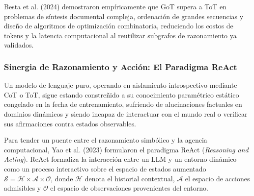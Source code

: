 Besta et al. (2024) demostraron empíricamente que GoT supera a ToT en problemas de síntesis documental compleja, ordenación de grandes secuencias y diseño de algoritmos de optimización combinatoria, reduciendo los costos de tokens y la latencia computacional al reutilizar subgrafos de razonamiento ya validados.

\subsubsection{Sinergia de Razonamiento y Acción: El Paradigma ReAct}

Un modelo de lenguaje puro, operando en aislamiento introspectivo mediante CoT o ToT, sigue estando constreñido a su conocimiento paramétrico estático congelado en la fecha de entrenamiento, sufriendo de alucinaciones factuales en dominios dinámicos y siendo incapaz de interactuar con el mundo real o verificar sus afirmaciones contra estados observables.

Para tender un puente entre el razonamiento simbólico y la agencia computacional, Yao et al. (2023) formularon el paradigma ReAct (\textit{Reasoning and Acting}). ReAct formaliza la interacción entre un LLM y un entorno dinámico como un proceso interactivo sobre el espacio de estados aumentado $\mathcal{S} = \mathcal{H} \times \mathcal{A} \times \mathcal{O}$, donde $\mathcal{H}$ denota el historial contextual, $\mathcal{A}$ el espacio de acciones admisibles y $\mathcal{O}$ el espacio de observaciones provenientes del entorno.

